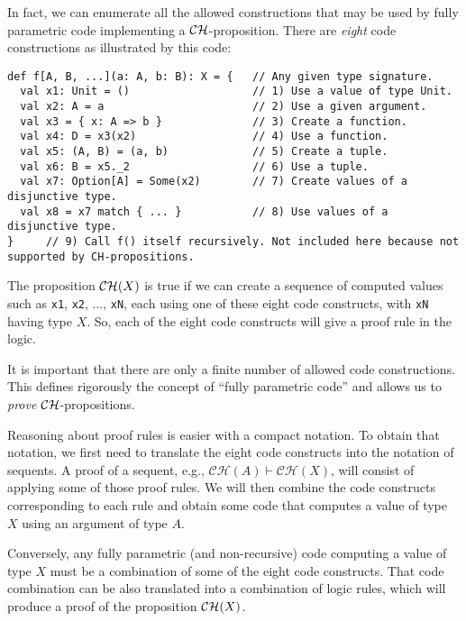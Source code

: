 In fact, we can enumerate all the allowed constructions that may be
used by fully parametric code implementing a ${\cal CH}$-proposition.
There are \emph{eight} code constructions
as illustrated by this code:
\begin{lstlisting}
def f[A, B, ...](a: A, b: B): X = {   // Any given type signature.
  val x1: Unit = ()                   // 1) Use a value of type Unit.
  val x2: A = a                       // 2) Use a given argument.
  val x3 = { x: A => b }              // 3) Create a function.
  val x4: D = x3(x2)                  // 4) Use a function.
  val x5: (A, B) = (a, b)             // 5) Create a tuple.
  val x6: B = x5._2                   // 6) Use a tuple.
  val x7: Option[A] = Some(x2)        // 7) Create values of a disjunctive type.
  val x8 = x7 match { ... }           // 8) Use values of a disjunctive type.
}     // 9) Call f() itself recursively. Not included here because not supported by CH-propositions.
\end{lstlisting}
The proposition ${\cal CH}(X)$ is true if we can create a sequence
of computed values such as \lstinline!x1!, \lstinline!x2!, ...,
\lstinline!xN!, each using one of these eight code constructs, with
\lstinline!xN! having type $X$. So, each of the eight code constructs
will give a proof rule in the logic.

It is important that there are only a finite number of allowed code
constructions. This defines rigorously the concept of \textsf{``}fully parametric
code\textsf{''} and allows us to \emph{prove}
${\cal CH}$-propositions.

Reasoning about proof rules is easier with a compact notation. To
obtain that notation, we first need to translate the eight code constructs
into the notation of sequents. A proof of a sequent, e.g., $\mathcal{CH}(A)\vdash\mathcal{CH}(X)$,
will consist of applying some of those proof rules. We will then combine
the code constructs corresponding to each rule and obtain some code
that computes a value of type $X$ using an argument of type $A$. 

Conversely, any fully parametric (and non-recursive) code computing
a value of type $X$ must be a combination of some of the eight code
constructs. That code combination
can be also translated into a combination of logic rules, which will
produce a proof of the proposition ${\cal CH}(X)$.

